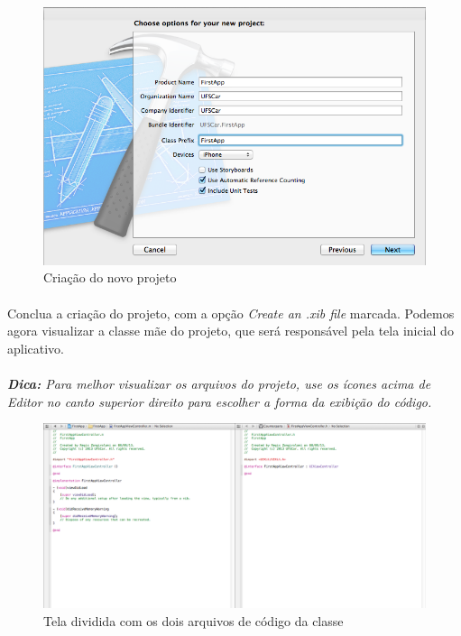 \documentclass[a4paper,12pt,brazil,doubleside]{book}
\begin{document}
\begin{figure}[h]
  \centering
  \includegraphics[totalheight=0.4\textheight]{figuras/1/novo_projeto2.png}
  \caption{Criação do novo projeto}
  \label{fig:a}
\end{figure}

\paragraph{}Conclua a criação do projeto, com a opção \emph{Create an .xib file} marcada. Podemos agora visualizar a classe mãe do projeto, que será responsável pela tela inicial do aplicativo.
\paragraph{}\textit{\textbf{Dica:} Para melhor visualizar os arquivos do projeto, use os ícones acima de Editor no canto superior direito para escolher a forma da exibição do código.}

\pagebreak

\begin{figure}[h]
  \centering
  \includegraphics[totalheight=0.3\textheight]{figuras/1/codigo_classe_mh.png}
  \caption{Tela dividida com os dois arquivos de código da classe}
  \label{fig:a}
\end{figure}
\end{document}
